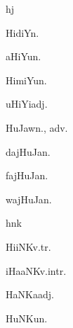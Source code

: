 \begin{multicols*}{2}
\begin{dictroot}{h}{j}
\begin{dictentry}{HidiY}{n.}
    \end{dictentry}
    \begin{dictentry}{aHiYu}{n.}
    \end{dictentry}
    \begin{dictentry}{HimiYu}{n.}
    \end{dictentry}
    \begin{dictentry}{uHiYi}{adj.}
    \end{dictentry}
    \begin{dictentry}{HuJaw}{n., adv.}
    \end{dictentry}
    \begin{dictentry}{dajHuJa}{n.}
    \end{dictentry}
    \begin{dictentry}{fajHuJa}{n.}
    \end{dictentry}
    \begin{dictentry}{wajHuJa}{n.}
    \end{dictentry}
\end{dictroot}

\begin{dictroot}{h}{nk}
    \begin{dictentry}{HiiNK}{v.tr.}
    \end{dictentry}
    \begin{dictentry}{iHaaNK}{v.intr.}
    \end{dictentry}
    \begin{dictentry}{HaNKa}{adj.}
    \end{dictentry}
    \begin{dictentry}{HuNKu}{n.}
    \end{dictentry}
\end{dictroot}


\end{multicols*}
